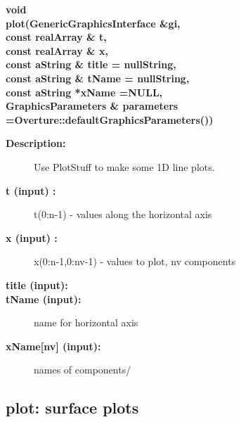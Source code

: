 \begin{flushleft} \textbf{%
void  \\ 
\settowidth{\PlotStuffIncludeArgIndent}{plot(}%
plot(GenericGraphicsInterface \&gi,\\ 
\hspace{\PlotStuffIncludeArgIndent}const realArray \& t, \\ 
\hspace{\PlotStuffIncludeArgIndent}const realArray \& x, \\ 
\hspace{\PlotStuffIncludeArgIndent}const aString \& title  = nullString, \\ 
\hspace{\PlotStuffIncludeArgIndent}const aString \& tName  = nullString,\\ 
\hspace{\PlotStuffIncludeArgIndent}const aString *xName         =NULL,\\ 
GraphicsParameters \& parameters  =Overture::defaultGraphicsParameters()) 
}\end{flushleft}
\begin{description}
\item[{\bf Description:}] 
    Use PlotStuff to make some 1D line plots. 
\item[{\bf t (input) :}]  t(0:n-1) - values along the horizontal axis
\item[{\bf x (input) :}]  x(0:n-1,0:nv-1) - values to plot, nv components
\item[{\bf title (input):}] 
\item[{\bf tName (input):}]  name for horizontal axis
\item[{\bf xName[nv] (input):}]  names of components/
\end{description}
\subsection{plot: surface plots}\label{timeSequence}
 
